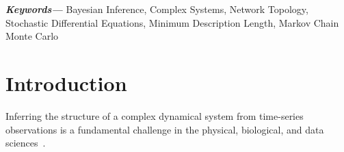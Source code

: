 \documentclass[10pt, aps, rmp,  twocolumn, superscriptaddress, floatfix, showkeys]{revtex4-2}
\providecommand{\keywords}[1]{\textbf{\textit{Keywords---}} #1}
\begin{document}
\keywords{Bayesian Inference, Complex Systems, Network Topology, Stochastic Differential Equations, Minimum Description Length, Markov Chain Monte Carlo}

\maketitle

\section{Introduction}

Inferring the structure of a complex dynamical system from time-series observations is a fundamental challenge in the physical, biological, and data sciences~\cite{newman2018network,peixoto2025network,nitzan2017revealing,timme2007revealing, brunton2016discovering}. 
\end{document}
